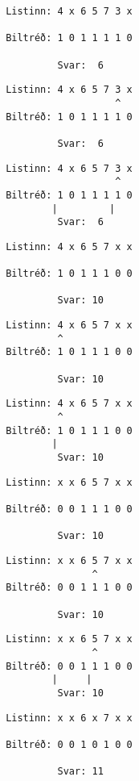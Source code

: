 { \begin{verbatim}
       Listinn: 4 x 6 5 7 3 x

       Biltréð: 1 0 1 1 1 1 0

                Svar:  6
\end{verbatim}}
{ \begin{verbatim}
       Listinn: 4 x 6 5 7 3 x
                          ^
       Biltréð: 1 0 1 1 1 1 0

                Svar:  6
\end{verbatim}}
{ \begin{verbatim}
       Listinn: 4 x 6 5 7 3 x
                          ^
       Biltréð: 1 0 1 1 1 1 0
               |         |
                Svar:  6
\end{verbatim}}
{ \begin{verbatim}
       Listinn: 4 x 6 5 7 x x

       Biltréð: 1 0 1 1 1 0 0

                Svar: 10
\end{verbatim}}
{ \begin{verbatim}
       Listinn: 4 x 6 5 7 x x
                ^
       Biltréð: 1 0 1 1 1 0 0

                Svar: 10
\end{verbatim}}
{ \begin{verbatim}
       Listinn: 4 x 6 5 7 x x
                ^
       Biltréð: 1 0 1 1 1 0 0
               |
                Svar: 10
\end{verbatim}}
{ \begin{verbatim}
       Listinn: x x 6 5 7 x x

       Biltréð: 0 0 1 1 1 0 0

                Svar: 10
\end{verbatim}}
{ \begin{verbatim}
       Listinn: x x 6 5 7 x x
                      ^
       Biltréð: 0 0 1 1 1 0 0

                Svar: 10
\end{verbatim}}
{ \begin{verbatim}
       Listinn: x x 6 5 7 x x
                      ^
       Biltréð: 0 0 1 1 1 0 0
               |     |
                Svar: 10
\end{verbatim}}
{ \begin{verbatim}
       Listinn: x x 6 x 7 x x

       Biltréð: 0 0 1 0 1 0 0

                Svar: 11
\end{verbatim}}
